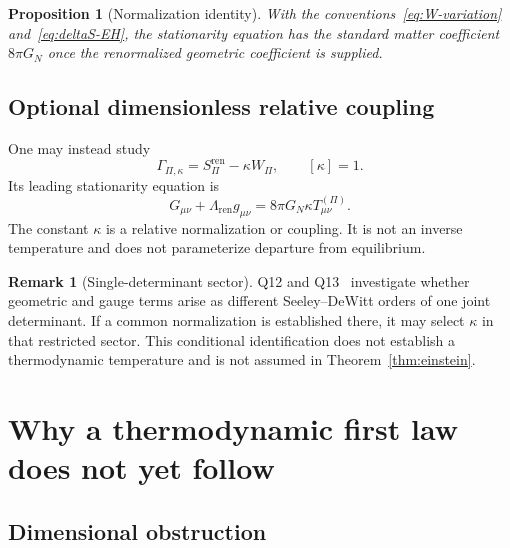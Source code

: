 \documentclass[12pt,a4paper]{article}
\newtheorem{proposition}[theorem]{Proposition}
\theoremstyle{definition}
\newtheorem{remark}[theorem]{Remark}
\newcommand{\Spi}{S_{\Pi}}
\begin{document}
      \begin{proposition}[Normalization identity]
        \label{prop:normalization}
        With the conventions~\eqref{eq:W-variation} and~\eqref{eq:deltaS-EH}, the stationarity equation has the
        standard matter coefficient $8\pi G_N$ once the renormalized geometric coefficient is supplied.
      \end{proposition}

    \subsection{Optional dimensionless relative coupling}

      One may instead study
      \begin{equation}
        \Gamma_{\Pi,\kappa}=\Spi^{\mathrm{ren}}-\kappa W_\Pi,
        \qquad [\kappa]=1.
        \label{eq:matter-norm}
      \end{equation}
      Its leading stationarity equation is
      \begin{equation}
        G_{\mu\nu}+\Lambda_{\mathrm{ren}}g_{\mu\nu}
        =8\pi G_N\kappa T^{(\Pi)}_{\mu\nu}.
        \label{eq:coupling-renorm}
      \end{equation}
      The constant $\kappa$ is a relative normalization or coupling.
      It is not an inverse temperature and does not parameterize departure from equilibrium.

      \begin{remark}[Single-determinant sector]
        \label{rmk:single-determinant}
        Q12 and Q13~\cite{Beau2026q12,Beau2026q13} investigate whether geometric and gauge terms arise as different
        Seeley--DeWitt orders of one joint determinant.
        If a common normalization is established there, it may select $\kappa$ in that restricted sector.
        This conditional identification does not establish a thermodynamic temperature and is not assumed in
        Theorem~\ref{thm:einstein}.
      \end{remark}

  \section{Why a thermodynamic first law does not yet follow}
    \label{sec:first-law}

    \subsection{Dimensional obstruction}
\end{document}
